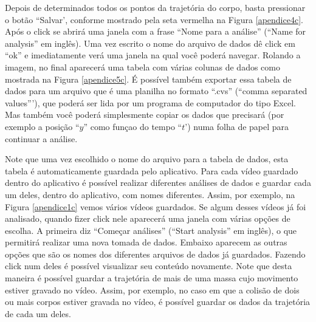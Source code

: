 \documentclass[12pt]{article}
\begin{document}
Depois de determinados todos os pontos da trajetória do corpo, basta pressionar o botão ``Salvar', conforme mostrado pela seta vermelha na Figura \ref{apendice4c}. Após o click se abrirá uma janela 
com a frase ``Nome para a análise'' (``Name for analysis'' em inglês). Uma vez escrito o nome do arquivo de dados dê click em ``ok'' e imediatamente verá uma janela na qual você poderá navegar. 
Rolando a imagem, no final aparecerá uma tabela com várias colunas de dados como mostrada na Figura \ref{apendice5c}.
É possível também exportar essa tabela de dados  para um arquivo que é uma planilha no formato ``.cvs'' (``comma separated values'''), que poderá ser lida por um programa de computador do tipo Excel. Mas também você poderá simplesmente copiar os dados que precisará (por exemplo 
a posição ``$y$'' como funçao do tempo ``$t$') numa folha de papel para continuar a análise. 
\par
Note que uma vez escolhido o nome do arquivo para a tabela de dados, esta tabela é automaticamente guardada pelo aplicativo. 
Para cada vídeo guardado dentro do aplicativo é possível realizar 
diferentes análises de dados e guardar cada um deles, dentro do aplicativo, 
com nomes diferentes.
Assim, por exemplo, na Figura \ref{apendice1c} vemos vários vídeos guardados.
Se algum desses vídeos já foi analisado, quando fizer click nele aparecerá uma janela com 
várias opções de escolha. A primeira diz ``Começar análises'' (``Start analysis'' em inglês), o que permitirá realizar uma nova tomada de dados. Embaixo aparecem as outras opções que são
os nomes dos diferentes arquivos de dados já guardados. Fazendo click num deles é possível visualizar seu conteúdo novamente. Note que desta maneira é possível guardar a trajetória de mais de uma massa cujo movimento estiver gravado no vídeo. Assim, por exemplo, no caso em que a colisão de dois ou mais corpos estiver gravada no vídeo, é possível guardar os dados da trajetória de cada um deles.  
\end{document}

